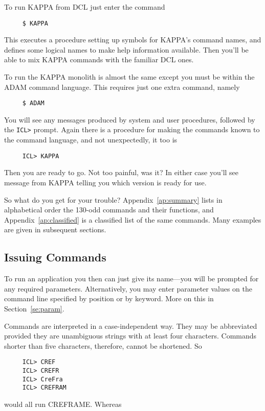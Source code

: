To run {\small KAPPA} from {\small DCL} just enter the command

\small
\begin{verbatim}
     $ KAPPA
\end{verbatim}
\normalsize
This executes a procedure setting up symbols for {\small KAPPA}'s command
names, and defines some logical names to make help information available.
Then you'll be able to mix {\small KAPPA} commands with the familiar
{\small DCL} ones.

To run the {\small KAPPA} monolith is almost the same except you must be
within the {\small ADAM} command language.  This requires just one extra
command, namely

\small
\begin{verbatim}
     $ ADAM
\end{verbatim}
\normalsize
You will see any messages produced by system and user procedures, followed
by the {\tt ICL>} prompt. Again there is a procedure for making the
commands known to the command language, and not unexpectedly, it too is

\small
\begin{verbatim}
     ICL> KAPPA
\end{verbatim}
\normalsize
Then you are ready to go.  Not too painful, was it?  In either case
you'll see message from KAPPA telling you which version is ready for
use.

So what do you get for your trouble?  Appendix~\ref{ap:summary} lists
in alphabetical order the 130-odd commands and their functions, and
Appendix~\ref{ap:classified} is a classified list of the same commands.
Many examples are given in subsequent sections.

\subsection{Issuing Commands}
To run an application you then can just give its name---you will be
prompted for any required parameters. Alternatively, you may enter
parameter values on the command line specified by position or by
keyword.  More on this in Section~\ref{se:param}.

Commands are interpreted in a case-independent way.
They may be abbreviated provided they are unambiguous strings with
at least four characters.  Commands shorter than five characters,
therefore, cannot be shortened. So

\small
\begin{verbatim}
     ICL> CREF
     ICL> CREFR
     ICL> CreFra
     ICL> CREFRAM
\end{verbatim}
\normalsize
would all run CREFRAME. Whereas

